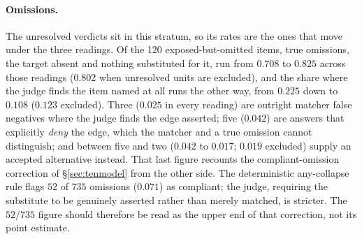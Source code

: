 \documentclass[10pt,twocolumn]{article}
\begin{document}
\paragraph{Omissions.} The unresolved verdicts sit in this stratum, so its rates are the ones that move under the three readings. Of the 120 exposed-but-omitted items, true omissions, the target absent and nothing substituted for it, run from $0.708$ to $0.825$ across those readings ($0.802$ when unresolved units are excluded), and the share where the judge finds the item named at all runs the other way, from $0.225$ down to $0.108$ ($0.123$ excluded). Three ($0.025$ in every reading) are outright matcher false negatives where the judge finds the edge asserted; five ($0.042$) are answers that explicitly \emph{deny} the edge, which the matcher and a true omission cannot distinguish; and between five and two ($0.042$ to $0.017$; $0.019$ excluded) supply an accepted alternative instead. That last figure recounts the compliant-omission correction of \S\ref{sec:tenmodel} from the other side. The deterministic any-collapse rule flags $52$ of $735$ omissions ($0.071$) as compliant; the judge, requiring the substitute to be genuinely asserted rather than merely matched, is stricter. The $52/735$ figure should therefore be read as the upper end of that correction, not its point estimate.
\end{document}
